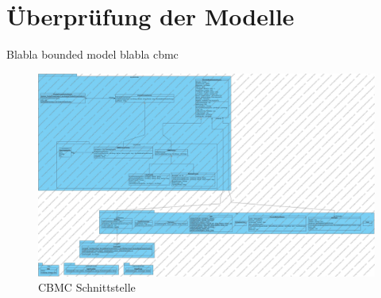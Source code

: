 \documentclass[a4paper]{scrreprt}
\begin{document}
\chapter{Überprüfung der Modelle}
Blabla bounded model blabla cbmc

\begin{figure}[H]
\includegraphics[scale=0.25, angle = 270]{cbmcDiagram.jpg}
\caption{CBMC Schnittstelle}
\label{concrete_view_of_beast_architecture}
\end{figure}
\end{document}
